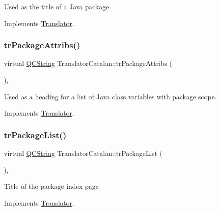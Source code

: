 Used as the title of a Java package 

Implements \mbox{\hyperlink{class_translator}{Translator}}.

\mbox{\label{class_translator_catalan_ae13f20696a10046c1484d86569e168de}} 
\subsubsection{\texorpdfstring{trPackageAttribs()}{trPackageAttribs()}}
{\footnotesize\ttfamily virtual \mbox{\hyperlink{class_q_c_string}{Q\+C\+String}} Translator\+Catalan\+::tr\+Package\+Attribs (\begin{DoxyParamCaption}{ }\end{DoxyParamCaption})\hspace{0.3cm}{\ttfamily [inline]}, {\ttfamily [virtual]}}

Used as a heading for a list of Java class variables with package scope. 

Implements \mbox{\hyperlink{class_translator}{Translator}}.

\mbox{\label{class_translator_catalan_afe5eaae577a672f373336f3f11f42365}} 
\subsubsection{\texorpdfstring{trPackageList()}{trPackageList()}}
{\footnotesize\ttfamily virtual \mbox{\hyperlink{class_q_c_string}{Q\+C\+String}} Translator\+Catalan\+::tr\+Package\+List (\begin{DoxyParamCaption}{ }\end{DoxyParamCaption})\hspace{0.3cm}{\ttfamily [inline]}, {\ttfamily [virtual]}}

Title of the package index page 

Implements \mbox{\hyperlink{class_translator}{Translator}}.

\mbox{\label{class_translator_catalan_af240780e47960a7257fe97d12eb78be7}} 

